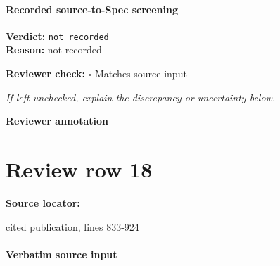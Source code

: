 \documentclass[10pt]{article}
\newcommand{\reviewerbox}{%
  \par\noindent\fbox{\parbox{0.96\linewidth}{\rule{0pt}{0.38in}}}\par
}
\newcommand{\reviewmatch}[1]{%
  \par\noindent\textbf{Reviewer check:} $\square$\; #1\par
  \noindent\emph{If left unchecked, explain the discrepancy or uncertainty below.}\par
}
\begin{document}
\paragraph{Recorded source-to-Spec screening}
\textbf{Verdict:} \texttt{not recorded}
\\
\textbf{Reason:} not recorded
\reviewmatch{Matches source input}
\noindent\textbf{Reviewer annotation}\par
\reviewerbox
\clearpage
\hypertarget{source-claim-1ca0bcb836cee48e}{}
\section*{Review row 18}
\textbf{Source locator:} {\footnotesize\raggedright cited publication, lines 833-\allowbreak{}924\par}
\paragraph{Verbatim source input}
\end{document}
